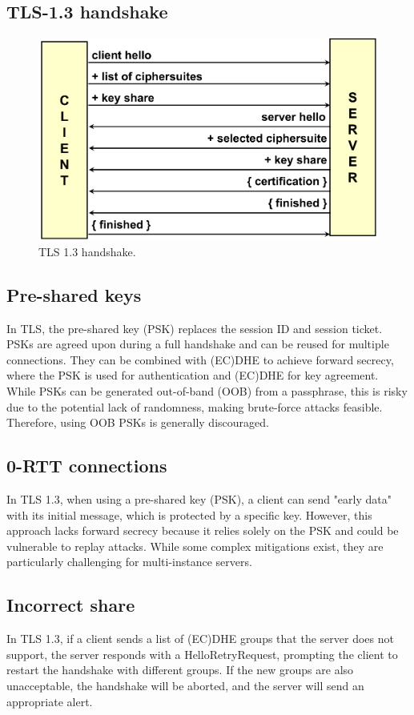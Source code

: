 \subsection{TLS-1.3 handshake}

\begin{figure}[H]
  \centering
  \includegraphics[width=.6\textwidth]{img/TLS 1-3 handshake.png}
  \caption{TLS 1.3 handshake.}
  \label{fig:tls-1.3-handshake}
\end{figure}

\subsection{Pre-shared keys}
In TLS, the pre-shared key (PSK) replaces the session ID and session
ticket. PSKs are agreed upon during a full handshake and can be reused
for multiple connections. They can be combined with (EC)DHE to achieve
forward secrecy, where the PSK is used for authentication and (EC)DHE
for key agreement. While PSKs can be generated out-of-band (OOB) from
a passphrase, this is risky due to the potential lack of randomness,
making brute-force attacks feasible. Therefore, using OOB PSKs is
generally discouraged.

\subsection{0-RTT connections}
In TLS 1.3, when using a pre-shared key (PSK), a client can send
"early data" with its initial message, which is protected by a
specific key. However, this approach lacks forward secrecy because it
relies solely on the PSK and could be vulnerable to replay attacks.
While some complex mitigations exist, they are particularly
challenging for multi-instance servers.

\subsection{Incorrect share}
In TLS 1.3, if a client sends a list of (EC)DHE groups that the server
does not support, the server responds with a HelloRetryRequest,
prompting the client to restart the handshake with different groups.
If the new groups are also unacceptable, the handshake will be
aborted, and the server will send an appropriate alert.

